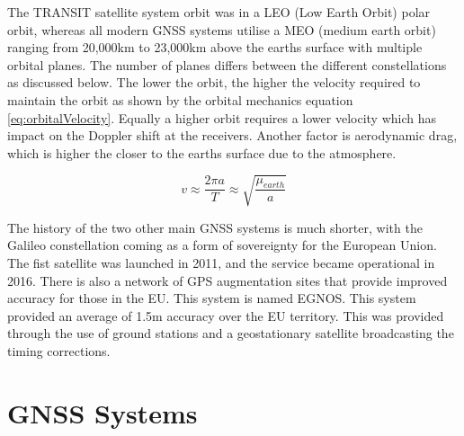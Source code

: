 The TRANSIT satellite system orbit was in a LEO (Low Earth Orbit) polar orbit, whereas all modern GNSS systems utilise a MEO (medium earth orbit) ranging from 20,000km to
23,000km above the earths surface with multiple orbital planes. The number of planes differs between the different constellations as discussed below. The lower the orbit,
the higher the velocity required to maintain the orbit as shown by the orbital mechanics equation \ref{eq:orbitalVelocity}. Equally a higher orbit requires a lower
velocity which has impact on the Doppler shift at the receivers. Another factor is aerodynamic drag, which is higher the closer to the earths surface due to the
atmosphere.

\begin{equation} \label{eq:orbitalVelocity}
    v \approx \frac{2\pi a}{T} \approx \sqrt{\frac{\mu_{earth}}{a}}
\end{equation} 

The history of the two other main GNSS systems is much shorter, with the Galileo constellation coming as a form of sovereignty for the European Union. The fist satellite
was launched in 2011, and the service became operational in 2016. There is also a network of GPS augmentation sites that provide improved accuracy for those in the EU.
This system is named EGNOS. This system provided an average of 1.5m accuracy over the EU territory. This was provided through the use of ground stations and a
geostationary satellite broadcasting the timing corrections. 


\section{GNSS Systems} \label{sec:GNSS}

